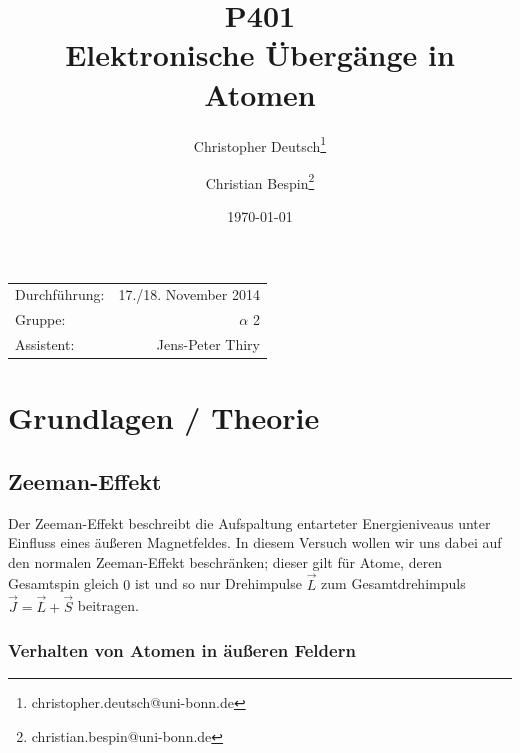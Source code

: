 \documentclass[11pt, a4paper]{article}
\title{P401 \\ Elektronische Übergänge in Atomen}
\author{Christopher Deutsch\footnote{christopher.deutsch@uni-bonn.de} \and Christian Bespin\footnote{christian.bespin@uni-bonn.de}}
\date{\today}
\begin{document}
\begin{titlepage}

\maketitle

\begin{center}
\begin{tabular}{l r}
Durchführung: & 17./18. November 2014 \\
Gruppe: & $\alpha$ 2 \\
Assistent: & Jens-Peter Thiry
\end{tabular}
\end{center}

\begin{abstract}
\noindent
\end{abstract}

\end{titlepage}

\tableofcontents
\newpage


\section{Grundlagen / Theorie}

\subsection{Zeeman-Effekt}

Der Zeeman-Effekt beschreibt die Aufspaltung entarteter Energieniveaus unter Einfluss eines äußeren Magnetfeldes.
In diesem Versuch wollen wir uns dabei auf den normalen Zeeman-Effekt beschränken; dieser gilt für Atome, deren Gesamtspin gleich $0$ ist und so nur Drehimpulse $\vec{L}$ zum Gesamtdrehimpuls $\vec{J}=\vec{L}+\vec{S}$ beitragen.

\subsubsection{Verhalten von Atomen in äußeren Feldern}
\label{sec:zeemaneffekt}
\end{document}
